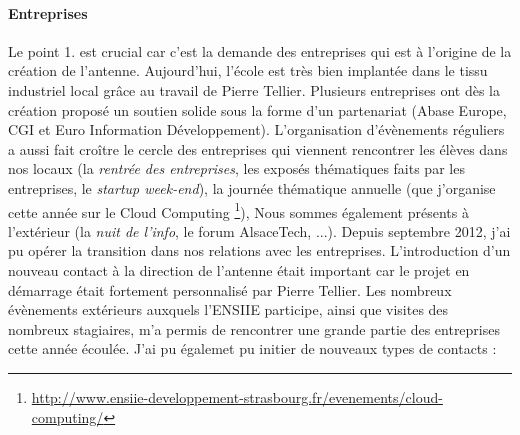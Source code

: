\documentclass[11pt]{article}
\begin{document}
\paragraph{Entreprises} 
Le point 1. est crucial car c'est la demande des entreprises qui est à l'origine
de la création de l'antenne.  Aujourd'hui,  l'école est très bien implantée dans
le  tissu  industriel local  grâce  au  travail  de Pierre  Tellier.   Plusieurs
entreprises ont  dès la création  proposé un soutien  solide sous la  forme d'un
partenariat   (Abase   Europe,   CGI   et   Euro   Information   Développement).
L'organisation  d'évènements  réguliers  a  aussi fait  croître  le  cercle  des
entreprises qui viennent rencontrer les élèves dans nos locaux (la \emph{rentrée
  des  entreprises},  les exposés  thématiques  faits  par les  entreprises,  le
\emph{startup week-end}),  la journée thématique annuelle  (que j'organise cette
année sur le Cloud Computing%
\footnote{\url{http://www.ensiie-developpement-strasbourg.fr/evenements/cloud-computing/}}),
Nous sommes également présents à l'extérieur (la \emph{nuit de l'info}, le forum
AlsaceTech, ...).  Depuis septembre 2012, j'ai  pu opérer la transition dans nos
relations  avec  les entreprises.   L'introduction  d'un  nouveau contact  à  la
direction  de  l'antenne  était  important  car le  projet  en  démarrage  était
fortement personnalisé  par Pierre  Tellier. Les nombreux  évènements extérieurs
auxquels  l'ENSIIE participe,  ainsi que  visites des  nombreux stagiaires,  m'a
permis de rencontrer une grande partie des entreprises cette année écoulée. J'ai
pu égalemet pu initier de nouveaux types de contacts :
\end{document}

